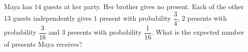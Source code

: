 Maya has $14$ guests at her party. Her brother gives no present. Each of the other $13$ guests independently gives $1$ present with probability $\dfrac34$, $2$ presents with probability $\dfrac3{16}$ and $3$ presents with probability $\dfrac1{16}$. What is the expected number of presents Maya receives?
